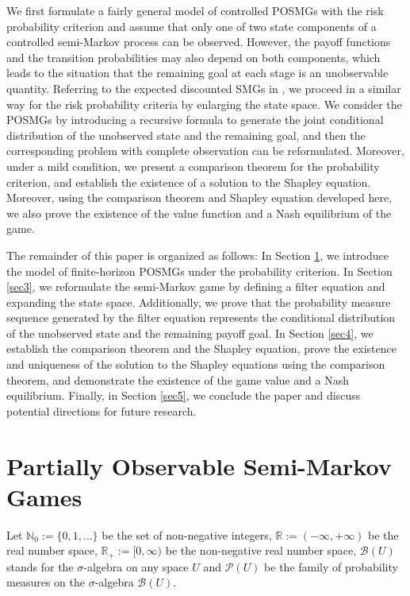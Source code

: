 \documentclass[12pt]{article}
\begin{document}
We first formulate a fairly general model of controlled POSMGs with the risk probability criterion and assume that only one of two state components of a controlled semi-Markov process can be observed. However, the payoff functions and the transition probabilities may also depend on both components, which leads to the situation that the remaining  goal at each stage
is an unobservable quantity.
Referring to the expected discounted SMGs  in \cite{ghosh2006partially},  we proceed in a similar way for the risk probability criteria by enlarging the state space. We consider the POSMGs by introducing a recursive formula to generate the joint conditional distribution of the unobserved state and the remaining goal, and then the corresponding problem with complete observation can be reformulated.
Moreover, 
under a mild condition, we present a comparison theorem for the probability criterion, and establish the existence of a solution to the Shapley equation. Moreover, using the comparison theorem and  Shapley equation developed here, we also prove the existence of the value function and a Nash equilibrium of the game.

 
The remainder of this paper is organized as follows: In Section \ref{sec2}, we introduce the model of finite-horizon POSMGs under the probability criterion. In Section \ref{sec3}, we reformulate the semi-Markov game by defining a filter equation and expanding the state space. Additionally, we prove that the probability measure sequence generated by the filter equation represents the conditional distribution of the unobserved state and the remaining payoff goal. In Section \ref{sec4}, we establish the comparison theorem and the Shapley equation, prove the existence and uniqueness of the solution to the Shapley equations using the comparison theorem, and demonstrate the existence of the game value and a Nash equilibrium. Finally, in Section \ref{sec5}, we conclude the paper and discuss potential directions for future research.


\section{Partially Observable Semi-Markov Games}\label{sec2}
Let $\mathbb{N}_0:=\{0,1,\ldots\}$ be the set of non-negative integers, $\mathbb{R}:=(-\infty,+\infty)$ be the real number space, $\mathbb{R}_+:=[0,\infty)$ be the non-negative real number space, $\mathscr{B}(U)$ stands for the $\sigma$-algebra on any space $U$ and $\mathscr{P}(U)$ be the family of probability measures on the $\sigma$-algebra $\mathscr{B}(U)$.
\end{document}
